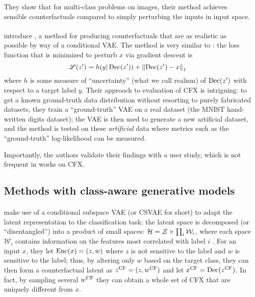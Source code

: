 \documentclass[../main.tex]{subfiles}
\begin{document}
They show that for multi-class problems on images, their method achieves sensible counterfactuals compared to simply perturbing the inputs in input space.

\paragraph{}

\citeauthor{antoranGetting2021} introduce  \cite{antoranGetting2021}, a method for producing counterfactuals that are as realistic as possible by way of a conditional VAE. The method is very similar to \revise: the loss function that is minimized to perturb $x$ via gradient descent is
\begin{equation}
    \mathscr{L}(z') = h(y | \operatorname{Dec}(z')) + \left\lVert\operatorname{Dec}(z') - x\right\rVert_1
\end{equation}
where $h$ is some measure of ``uncertainty'' (what we call realism) of $\operatorname{Dec}(z')$ with respect to a target label $y$.
Their approach to evaluation of CFX is intriguing:
to get a known ground-truth data distribution without resorting to purely
fabricated datasets, they train a ``ground-truth'' VAE on a real dataset (the MNIST hand-written digits dataset);
the VAE is then used to generate a new artificial dataset, and the method is tested on these \emph{artificial} data where
metrics such as the ``ground-truth'' log-likelihood can be measured.

Importantly, the authors validate their findings with a user study, which is not frequent in works on CFX.

\subsection{Methods with class-aware generative models}

\paragraph{}

\citeauthor{downsCRUDS2020} make use of a conditional subspace VAE (or CSVAE for short) to adapt the latent representation to the classification task:
the latent space is decomposed (or ``disentangled'') into a product of small spaces: $\mathcal{H} = \mathcal{Z} \times \prod_{i} \mathcal{W}_i$, where each space $\mathcal{W}_i$ contains information on the features most correlated with label $i$ \cite{klysLearning2018}.
For an input $x$, they let $\operatorname{Enc}(x) = (z, w)$ where $z$ is not sensitive to the label and $w$ is sensitive to the label; thus, by altering only $w$ based on the target class, they can then form a counterfactual latent as $z^\mathrm{CF} = (z, w^\mathrm{CF})$ and let $x^\mathrm{CF} = \operatorname{Dec}(z^\mathrm{CF})$.
In fact, by sampling several $w^\mathrm{CF}$ they can obtain a whole set of CFX that are uniquely different from $x$.
\end{document}
